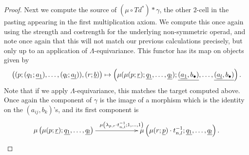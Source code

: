 \begin{proof}
Next we compute the source of $(\mu \circ Td^{*})*\gamma$, the other $2$-cell in the pasting appearing in the first multiplication axiom. We compute this once again using the strength and costrength for the underlying non-symmetric operad, and note once again that this will not match our previous calculations precisely, but only up to an application of $\Lambda$-equivariance. This functor has its map on objects given by
  \[
    \left( (p; (q_{1}; \underline{a_{1}}), \ldots, (q_{l}; \underline{a_{l}})), (r; \underline{b}) \right) \mapsto \left(\mu(\mu(p; \underline{r}); \underline{q_{1}}, \ldots, \underline{q_{l}}); \underline{(\underline{a_{1}}, b_{\bullet})}, \ldots, \underline{(\underline{a_{l}}, b_{\bullet})} \right).
  \]
  Note that if we apply $\Lambda$-equivariance, this matches the target computed above. Once again the component of $\gamma$ is the image of a morphism which is the identity on the $(a_{ij}, b_{k})$'s, and its first component is
  \[
    \xy
      {\ar^{\mu\left(\lambda_{p,r} \cdot t^{-1}_{n,l}; 1, \ldots, 1\right)} (0,0)*+{\mu\left(\mu(p; \un{r}); \un{q_{1}}, \ldots, \un{q_{l}}\right)}; (60,0)*+{\mu\left(\mu(r; \un{p})\cdot t^{-1}_{n,l}; \un{q_{1}}, \ldots, \un{q_{l}}\right).} }
    \endxy
  \]


\end{proof}
